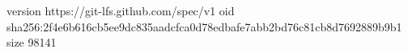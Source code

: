version https://git-lfs.github.com/spec/v1
oid sha256:2f4e6b616cb5ee9dc835aadcfca0d78edbafe7abb2bd76c81cb8d7692889b9b1
size 98141
